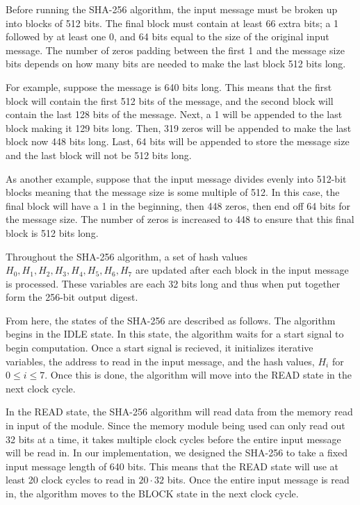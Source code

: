 \documentclass{article}
\begin{document}

Before running the SHA-256 algorithm, the input message must be broken up into blocks of 512 bits. The final block must contain at least 66 extra bits; a 1 followed by at least one 0, and 64 bits equal to the size of the original input message. The number of zeros padding between the first 1 and the message size bits depends on how many bits are needed to make the last block 512 bits long.

For example, suppose the message is 640 bits long. This means that the first block will contain the first 512 bits of the message, and the second block will contain the last 128 bits of the message. Next, a 1 will be appended to the last block making it 129 bits long. Then, 319 zeros will be appended to make the last block now 448 bits long. Last, 64 bits will be appended to store the message size and the last block will not be 512 bits long.

As another example, suppose that the input message divides evenly into 512-bit blocks meaning that the message size is some multiple of 512. In this case, the final block will have a 1 in the beginning, then 448 zeros, then end off 64 bits for the message size. The number of zeros is increased to 448 to ensure that this final block is 512 bits long.

Throughout the SHA-256 algorithm, a set of hash values $H_0, H_1, H_2, H_3, H_4, H_5, H_6, H_7$ are updated after each block in the input message is processed. These variables are each 32 bits long and thus when put together form the 256-bit output digest.

From here, the states of the SHA-256 are described as follows. The algorithm begins in the IDLE state. In this state, the algorithm waits for a start signal to begin computation. Once a start signal is recieved, it initializes iterative variables, the address to read in the input message, and the hash values, $H_i$ for $0 \leq i \leq 7$. Once this is done, the algorithm will move into the READ state in the next clock cycle.

In the READ state, the SHA-256 algorithm will read data from the memory read in input of the module. Since the memory module being used can only read out 32 bits at a time, it takes multiple clock cycles before the entire input message will be read in. In our implementation, we designed the SHA-256 to take a fixed input message length of 640 bits. This means that the READ state will use at least 20 clock cycles to read in $20\cdot 32$ bits. Once the entire input message is read in, the algorithm moves to the BLOCK state in the next clock cycle.
\end{document}
